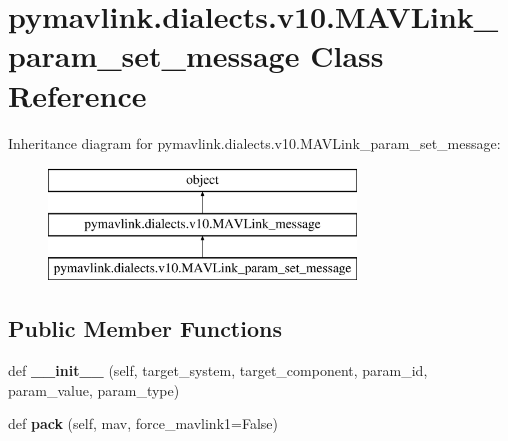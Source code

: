 \hypertarget{classpymavlink_1_1dialects_1_1v10_1_1MAVLink__param__set__message}{}\section{pymavlink.\+dialects.\+v10.\+M\+A\+V\+Link\+\_\+param\+\_\+set\+\_\+message Class Reference}
\label{classpymavlink_1_1dialects_1_1v10_1_1MAVLink__param__set__message}
Inheritance diagram for pymavlink.\+dialects.\+v10.\+M\+A\+V\+Link\+\_\+param\+\_\+set\+\_\+message\+:\begin{figure}[H]
\begin{center}
\leavevmode
\includegraphics[height=3.000000cm]{classpymavlink_1_1dialects_1_1v10_1_1MAVLink__param__set__message}
\end{center}
\end{figure}
\subsection*{Public Member Functions}
\begin{DoxyCompactItemize}
\item 
\mbox{\label{classpymavlink_1_1dialects_1_1v10_1_1MAVLink__param__set__message_a3c91570c5c8a590d2a71833bb795d6e4}} 
def {\bfseries \+\_\+\+\_\+init\+\_\+\+\_\+} (self, target\+\_\+system, target\+\_\+component, param\+\_\+id, param\+\_\+value, param\+\_\+type)
\item 
\mbox{\label{classpymavlink_1_1dialects_1_1v10_1_1MAVLink__param__set__message_a18a10dc9f0dbcba864d97bc825e3dc4f}} 
def {\bfseries pack} (self, mav, force\+\_\+mavlink1=False)
\end{DoxyCompactItemize}
